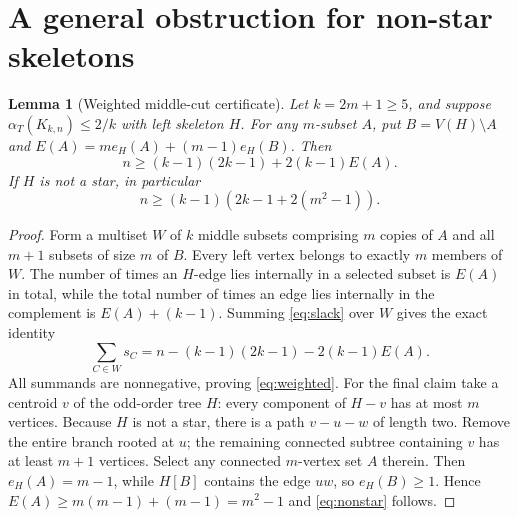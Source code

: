 \documentclass[11pt,a4paper]{article}
\newtheorem{lemma}[theorem]{Lemma}
\newcommand{\al}{\alpha}
\newcommand{\KK}[2]{K_{#1,#2}}
\begin{document}
\section{A general obstruction for non-star skeletons}
\begin{lemma}[Weighted middle-cut certificate]\label{lem:nonstar}
Let $k=2m+1\ge5$, and suppose $\al_T(\KK{k}{n})\le2/k$ with left skeleton $H$. For any $m$-subset $A$, put $B=V(H)\setminus A$ and
$E(A)=m e_H(A)+(m-1)e_H(B)$. Then
\begin{equation}\label{eq:weighted}
n\ge(k-1)(2k-1)+2(k-1)E(A).
\end{equation}
If $H$ is not a star, in particular
\begin{equation}\label{eq:nonstar}
n\ge(k-1)(2k-1+2(m^2-1)).
\end{equation}
\end{lemma}
\begin{proof}
Form a multiset $W$ of $k$ middle subsets comprising $m$ copies of $A$ and all $m+1$ subsets of size $m$ of $B$. Every left vertex belongs to exactly $m$ members of $W$. The number of times an $H$-edge lies internally in a selected subset is $E(A)$ in total, while the total number of times an edge lies internally in the complement is $E(A)+(k-1)$. Summing \eqref{eq:slack} over $W$ gives the exact identity
\[
\sum_{C\in W}s_C=n-(k-1)(2k-1)-2(k-1)E(A).
\]
All summands are nonnegative, proving \eqref{eq:weighted}. For the final claim take a centroid $v$ of the odd-order tree $H$: every component of $H-v$ has at most $m$ vertices. Because $H$ is not a star, there is a path $v-u-w$ of length two. Remove the entire branch rooted at $u$; the remaining connected subtree containing $v$ has at least $m+1$ vertices. Select any connected $m$-vertex set $A$ therein. Then $e_H(A)=m-1$, while $H[B]$ contains the edge $uw$, so $e_H(B)\ge1$. Hence $E(A)\ge m(m-1)+(m-1)=m^2-1$ and \eqref{eq:nonstar} follows.\end{proof}
\end{document}
